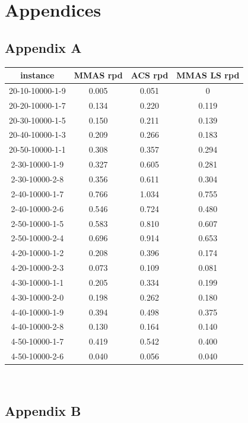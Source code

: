 \documentclass{article}
\begin{document}
\section{Appendices}

\subsection{Appendix A}

\label{app:rpd}

\begin{tabular}{c|c|c|c}
instance & MMAS rpd & ACS rpd & MMAS LS rpd \\
\hline
20-10-10000-1-9 & 0.005 & 0.051 & 0 \\
20-20-10000-1-7 & 0.134 & 0.220 & 0.119 \\
20-30-10000-1-5 & 0.150 & 0.211 & 0.139 \\
20-40-10000-1-3 & 0.209 & 0.266 & 0.183 \\
20-50-10000-1-1 & 0.308 & 0.357 & 0.294 \\
2-30-10000-1-9 & 0.327 & 0.605 & 0.281 \\
2-30-10000-2-8 & 0.356 & 0.611 & 0.304 \\
2-40-10000-1-7 & 0.766 & 1.034 & 0.755 \\
2-40-10000-2-6 & 0.546 & 0.724 & 0.480 \\
2-50-10000-1-5 & 0.583 & 0.810 & 0.607 \\
2-50-10000-2-4 & 0.696 & 0.914 & 0.653 \\
4-20-10000-1-2 & 0.208 & 0.396 & 0.174 \\
4-20-10000-2-3 & 0.073 & 0.109 & 0.081 \\
4-30-10000-1-1 & 0.205 & 0.334 & 0.199 \\
4-30-10000-2-0 & 0.198 & 0.262 & 0.180 \\
4-40-10000-1-9 & 0.394 & 0.498 & 0.375 \\
4-40-10000-2-8 & 0.130 & 0.164 & 0.140 \\
4-50-10000-1-7 & 0.419 & 0.542 & 0.400 \\
4-50-10000-2-6 & 0.040 & 0.056 & 0.040 \\
\end{tabular} \\

\subsection{Appendix B}

\label{app:rpdsum}
\end{document}

